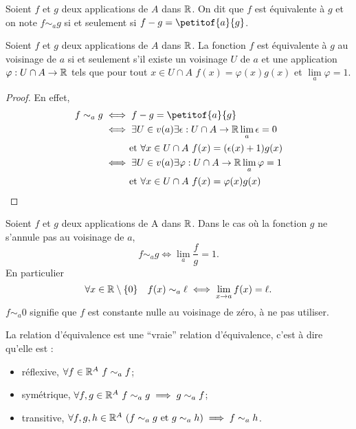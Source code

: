 \begin{defdef}
  Soient $f$ et $g$ deux applications de $A$ dans $\mathbb{R}$. On dit que $f$ est équivalente à $g$ et on note $f \sim_{a} g$ si et seulement si $f-g=\petitof{a}{g}$.
\end{defdef}
\begin{prop}
  Soient $f$ et $g$ deux applications de $A$ dans $\mathbb{R}$. La fonction $f$ est équivalente à $g$ au voisinage de $a$ si et seulement s'il existe un voisinage $U$ de $a$ et une application $\varphi : U\cap A \rightarrow \mathbb{R}$ tels que pour tout $x \in U \cap A$ $f(x)=\varphi(x)g(x)$ et $\lim\limits_{a}\varphi =1$.
\end{prop}
\begin{proof}
  En effet,
  \begin{align}
    f \sim_a g &\iff f-g = \petitof{a}{g}\\
    &\iff \exists U \in v(a) \exists \epsilon:U\cap A \rightarrow \R \lim\limits_{a}\epsilon = 0 \notag \\
    &\phantom{\iff} \text{~et~} \forall x \in U\cap A \ f(x)=(\epsilon(x)+1)g(x) \\
    &\iff \exists U \in v(a) \exists \varphi:U\cap A \rightarrow \R \lim\limits_{a}\varphi = 1 \notag \\
    &\phantom{\iff} \text{~et~} \forall x \in U\cap A \ f(x)=\varphi(x)g(x) 
  \end{align}
\end{proof}
\begin{prop}
  Soient $f$ et $g$ deux applications de A dans $\mathbb{R}$. Dans le cas où la fonction $g$ ne s'annule pas au voisinage de $a$,
  \begin{equation}
    f \sim_a g \iff \lim\limits_a\frac{f}{g}=1.
  \end{equation}
  En particulier
  \begin{equation}
    \forall x \in \mathbb{R}\setminus\{0\} \quad f(x) \sim_a \ell \iff \lim\limits_{x \to a} f(x) =\ell.
  \end{equation}
  $f \sim_a 0$ signifie que $f$ est constante nulle au voisinage de zéro, à ne pas utiliser.
\end{prop}
\begin{prop}
  La relation d'équivalence est une ``vraie'' relation d'équivalence, c'est à dire qu'elle est :
  \begin{itemize}
  \item réflexive, $\forall f \in \mathbb{R}^A \ f \sim_a f$;
  \item symétrique, $\forall f,g \in \mathbb{R}^A \ f \sim_a g \implies g \sim_a f$;
  \item transitive, $\forall f,g,h \in \R^A \ (f \sim_a g \text{~et~} g\sim_a h) \implies f \sim_a h$.
  \end{itemize}
\end{prop}
